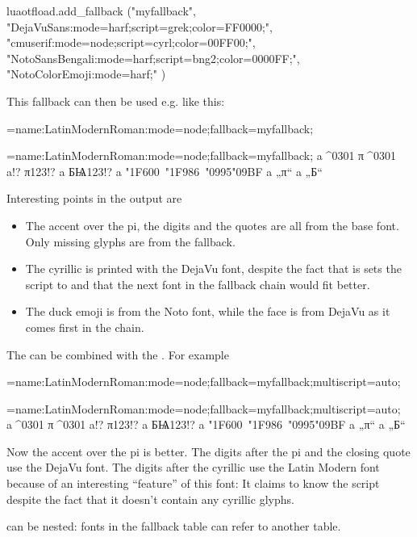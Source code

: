    \beginlisting
   \directlua
    {luaotfload.add_fallback
     ("myfallback",
       {
        "DejaVuSans:mode=harf;script=grek;color=FF0000;",
        "cmuserif:mode=node;script=cyrl;color=00FF00;",
        "NotoSansBengali:mode=harf;script=bng2;color=0000FF;",
        "NotoColorEmoji:mode=harf;"
       }
     )
    }
   \endlisting

   This fallback can then be used e.g. like this:

   \beginlisting
   \font\test={name:LatinModernRoman:mode=node;fallback=myfallback;}
   \endlisting

   {\Large
    \font\test={name:LatinModernRoman:mode=node;fallback=myfallback;} a^^^^0301 π^^^^0301 a!? π123!? a БѨ123!? a \char"1F600\ \char"1F986\ \char"0995\char"09BF a „π“ a „Б“
   }

   Interesting points in the output are
   \begin{itemize}
   \item The accent over the pi, the digits and the quotes are all from the base font. Only missing glyphs are from the fallback.
   \item The cyrillic is printed with the DejaVu font, despite the fact that is sets the script to  and that the next font in the fallback chain would fit better.
   \item The duck emoji is from the Noto font, while the face is from DejaVu as it comes first in the chain.
   \end{itemize}

   The  can be combined with the . For example

   \beginlisting
   \font\test={name:LatinModernRoman:mode=node;fallback=myfallback;multiscript=auto;}
   \endlisting

   {\Large
    \font\test={name:LatinModernRoman:mode=node;fallback=myfallback;multiscript=auto;} a^^^^0301 π^^^^0301 a!? π123!? a БѨ123!? a \char"1F600\ \char"1F986\ \char"0995\char"09BF a „π“ a „Б“
   }

   Now the accent over the pi is better. The digits after the pi and the closing quote use the DejaVu font. The digits after
   the cyrillic use the Latin Modern font because of an interesting \enquote{feature} of this font: It claims to know the  script despite the fact that it doesn't contain any cyrillic glyphs.

    can be nested: fonts in the fallback table can refer to another  table.

